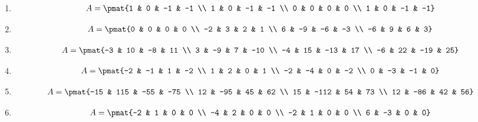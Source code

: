 \begin{enumerate}
\item

\begin{align*}
A = \pmat{1 & 0 & -1 & -1 \\ 1 & 0 & -1 & -1 \\ 0 & 0 & 0 & 0 \\ 1 & 0 & -1 & -1}
\end{align*}

\item

\begin{align*}
A = \pmat{0 & 0 & 0 & 0 \\ -2 & 3 & 2 & 1 \\ 6 & -9 & -6 & -3 \\ -6 & 9 & 6 & 3}
\end{align*}

\item

\begin{align*}
A = \pmat{-3 & 10 & -8 & 11 \\ 3 & -9 & 7 & -10 \\ -4 & 15 & -13 & 17 \\ -6 & 22 & -19 & 25}
\end{align*}

\item

\begin{align*}
A = \pmat{-2 & -1 & 1 & -2 \\ 1 & 2 & 0 & 1 \\ -2 & -4 & 0 & -2 \\ 0 & -3 & -1 & 0}
\end{align*}

\item

\begin{align*}
A = \pmat{-15 & 115 & -55 & -75 \\ 12 & -95 & 45 & 62 \\ 15 & -112 & 54 & 73 \\ 12 & -86 & 42 & 56}
\end{align*}

\item

\begin{align*}
A = \pmat{-2 & 1 & 0 & 0 \\ -4 & 2 & 0 & 0 \\ -2 & 1 & 0 & 0 \\ 6 & -3 & 0 & 0}
\end{align*}


\end{enumerate}

